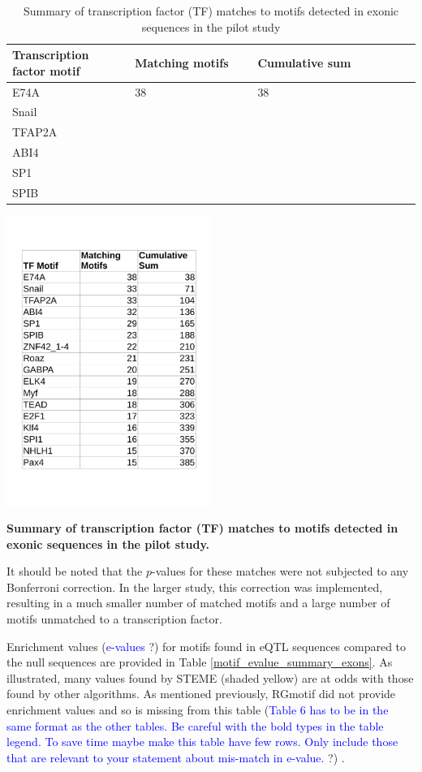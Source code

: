 \documentclass[12pt]{article}
\begin{document}
\begin{table}[!ht]
\centering
\caption{Summary of transcription factor (TF) matches to motifs detected in exonic sequences in the pilot study}\label{fig: motif_tf_summary_exons}
\begin{tabular}{p{0.3\linewidth}p{0.3\linewidth}p{0.3\linewidth}p{0.4\linewidth}}
\toprule[0.2em]
Transcription factor motif & Matching motifs & Cumulative sum\\ 
\midrule[0.1em]
E74A & 38 & 38 \\
Snail\\
TFAP2A\\
ABI4\\
SP1\\
SPIB\\
\bottomrule[0.2em]
\end{tabular}
\end{table} 

\begin{table}[!htbp]
    \centering
     \includegraphics[width= 0.5\textwidth]{table4_study.pdf} 
    \caption{{\bf Summary of transcription factor (TF) matches to motifs detected in exonic sequences in the pilot study.}}
    \label{fig: motif_tf_summary_exons}
\end{table}
 
It should be noted that the $p$-values for these matches were not subjected to any Bonferroni correction. In the larger study, this correction was implemented, resulting in a much smaller number of matched motifs and a large number of motifs unmatched to a transcription factor.

Enrichment values (\textcolor{blue}{e-values} ?) for motifs found in eQTL sequences compared to the null sequences are provided in Table \ref{motif_evalue_summary_exons}. As illustrated, many values found by STEME (shaded yellow) are at odds with those found by other algorithms. As mentioned previously, RGmotif did not provide enrichment values and so is missing from this table  (\textcolor{blue}{Table 6 has to be in the same
format as the other tables. Be careful with the bold types in the table legend. To save time maybe make this table have few rows. Only include those
that are relevant to your statement about mis-match in e-value.} ?) . 
\end{document}
